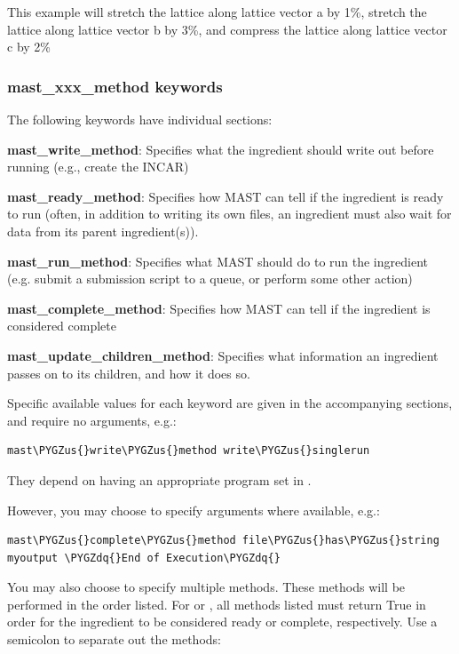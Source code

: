 \documentclass[letterpaper,10pt,english]{sphinxmanual}
\def\PYGZus{\char`\_}
\def\PYGZdq{\char`\"}
\begin{document}
This example will stretch the lattice along lattice vector a by 1\%, stretch the lattice along lattice vector b by 3\%, and compress the lattice along lattice vector c by 2\%


\subsubsection{mast\_xxx\_method keywords}
\label{3_1_2_ingredients:mast-xxx-method-keywords}
The following keywords have individual sections:

\textbf{mast\_write\_method}: Specifies what the ingredient should write out before running (e.g., create the INCAR)

\textbf{mast\_ready\_method}: Specifies how MAST can tell if the ingredient is ready to run (often, in addition to writing its own files, an ingredient must also wait for data from its parent ingredient(s)).

\textbf{mast\_run\_method}: Specifies what MAST should do to run the ingredient (e.g. submit a submission script to a queue, or perform some other action)

\textbf{mast\_complete\_method}: Specifies how MAST can tell if the ingredient is considered complete

\textbf{mast\_update\_children\_method}: Specifies what information an ingredient passes on to its children, and how it does so.

Specific available values for each keyword are given in the accompanying sections, and require no arguments, e.g.:

\begin{Verbatim}[commandchars=\\\{\}]
mast\PYGZus{}write\PYGZus{}method write\PYGZus{}singlerun
\end{Verbatim}

They depend on having an appropriate program set in .

However, you may choose to specify arguments where available, e.g.:

\begin{Verbatim}[commandchars=\\\{\}]
mast\PYGZus{}complete\PYGZus{}method file\PYGZus{}has\PYGZus{}string myoutput \PYGZdq{}End of Execution\PYGZdq{}
\end{Verbatim}

You may also choose to specify multiple methods. These methods will be performed in the order listed. For  or , all methods listed must return True in order for the ingredient to be considered ready or complete, respectively.
Use a semicolon to separate out the methods:
\end{document}
